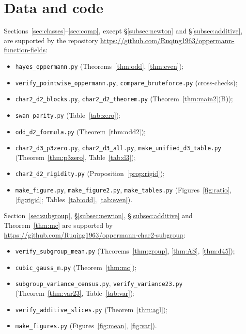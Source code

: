 \documentclass[11pt,a4paper]{amsart}
\theoremstyle{definition}
\theoremstyle{remark}
\begin{document}
\section*{Data and code}
Sections~\ref{sec:classes}--\ref{sec:comp}, except \S\ref{subsec:newton} and \S\ref{subsec:additive}, are supported by
the repository \url{https://github.com/Ruqing1963/oppermann-function-fields}:
\begin{itemize}
\item \texttt{hayes\_oppermann.py} (Theorems~\ref{thm:odd}, \ref{thm:even});
\item \texttt{verify\_pointwise\_oppermann.py}, \texttt{compare\_bruteforce.py} (cross-checks);
\item \texttt{char2\_d2\_blocks.py}, \texttt{char2\_d2\_theorem.py} (Theorem~\ref{thm:main2}(B));
\item \texttt{swan\_parity.py} (Table~\ref{tab:zero});
\item \texttt{odd\_d2\_formula.py} (Theorem~\ref{thm:odd2});
\item \texttt{char2\_d3\_p3zero.py}, \texttt{char2\_d3\_all.py}, \texttt{make\_unified\_d3\_table.py}
(Theorem~\ref{thm:p3zero}, Table~\ref{tab:d3});
\item \texttt{char2\_d2\_rigidity.py} (Proposition~\ref{prop:rigid});
\item \texttt{make\_figure.py}, \texttt{make\_figure2.py}, \texttt{make\_tables.py} (Figures~\ref{fig:ratio},
\ref{fig:rigid}; Tables~\ref{tab:odd}, \ref{tab:even}).
\end{itemize}
Section~\ref{sec:subgroup}, \S\ref{subsec:newton}, \S\ref{subsec:additive} and Theorem~\ref{thm:mc} are supported by
\url{https://github.com/Ruqing1963/oppermann-char2-subgroup}:
\begin{itemize}
\item \texttt{verify\_subgroup\_mean.py} (Theorems~\ref{thm:group}, \ref{thm:AS}, \ref{thm:d45});
\item \texttt{cubic\_gauss\_m.py} (Theorem~\ref{thm:mc});
\item \texttt{subgroup\_variance\_census.py}, \texttt{verify\_variance23.py} (Theorem~\ref{thm:var23},
Table~\ref{tab:var});
\item \texttt{verify\_additive\_slices.py} (Theorem~\ref{thm:agl});
\item \texttt{make\_figures.py} (Figures~\ref{fig:mean}, \ref{fig:var}).
\end{itemize}
\end{document}
